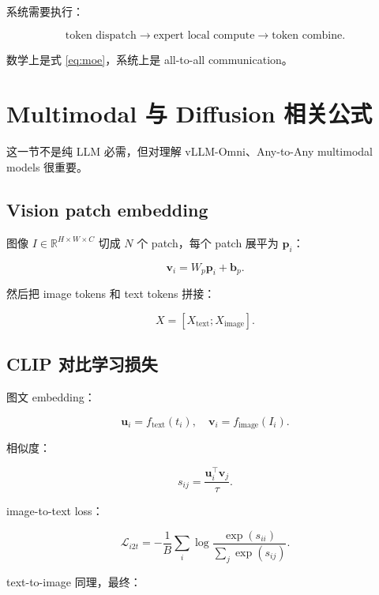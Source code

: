 \documentclass[UTF8,12pt]{ctexart}
\newcommand{\R}{\mathbb{R}}
\newcommand{\1}{\mathbf{1}}
\begin{document}
系统需要执行：

\[
\text{token dispatch}
\rightarrow
\text{expert local compute}
\rightarrow
\text{token combine}.
\]

数学上是式 \eqref{eq:moe}，系统上是 all-to-all communication。

\section{Multimodal 与 Diffusion 相关公式}

这一节不是纯 LLM 必需，但对理解 vLLM-Omni、Any-to-Any multimodal models 很重要。

\subsection{Vision patch embedding}

图像 $I\in\R^{H\times W\times C}$ 切成 $N$ 个 patch，每个 patch 展平为 $\bm{p}_i$：

\begin{equation}
\bm{v}_i=W_p\bm{p}_i+\bm{b}_p.
\end{equation}

然后把 image tokens 和 text tokens 拼接：

\begin{equation}
X=[X_{\mathrm{text}};X_{\mathrm{image}}].
\end{equation}

\subsection{CLIP 对比学习损失}

图文 embedding：

\begin{equation}
\bm{u}_i=f_{\mathrm{text}}(t_i),
\quad
\bm{v}_i=f_{\mathrm{image}}(I_i).
\end{equation}

相似度：

\begin{equation}
s_{ij}=\frac{\bm{u}_i^\top\bm{v}_j}{\tau}.
\end{equation}

image-to-text loss：

\begin{equation}
\mathcal{L}_{i2t}
=-\frac{1}{B}\sum_i
\log
\frac{\exp(s_{ii})}{\sum_j\exp(s_{ij})}.
\end{equation}

text-to-image 同理，最终：
\end{document}
